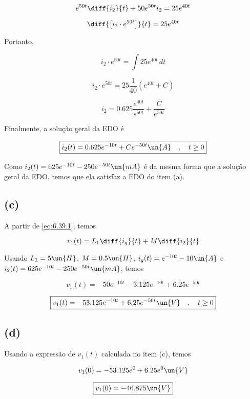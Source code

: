 \[ e^{50t}\diff{i_2}{t} + 50e^{50t}i_2 =  25e^{40t} \]

\[ \diff{\left[i_2 \cdot e^{50t}\right]}{t} = 25e^{40t} \]

Portanto,

\[ i_2 \cdot e^{50t} = \int 25e^{40t} \, dt \]

\[ i_2 \cdot e^{50t} = 25 \frac{1}{40} (e^{40t} + C) \]

\[ i_2 = 0.625 \frac{e^{40t}}{e^{50t}} + \frac{C}{e^{50t}} \]

Finalmente, a solução geral da EDO é

\[ \boxed{i_2(t) = 0.625e^{-10t} + Ce^{-50t} \un{A} \quad , \quad t \geq 0}  \]

Como $i_2(t) = 625e^{-10t} - 250e^{-50t} \un{mA}$ é da mesma forma que a solução geral da EDO, temos que ela satisfaz a
EDO do item (a).

\subsection*{(c)}

A partir de \eqref{eq:6.39.1}, temos

\[ v_1(t) = L_1\diff{i_g}{t} + M\diff{i_2}{t} \]

Usando $L_1 = 5\un{H}$, $M = 0.5 \un{H}$, $i_g(t) = e^{-10t} - 10 \un{A}$ e $i_2(t) = 625e^{-10t} - 250e^{-50t} \un{mA}$, temos

\[ v_1(t) = -50e^{-10t} -3.125e^{-10t} + 6.25e^{-50t} \]

\[ \boxed{v_1(t) = -53.125e^{-10t} + 6.25e^{-50t} \un{V} \quad , \quad t \geq 0}  \]

\subsection*{(d)}

Usando a expressão de $v_1(t)$ calculada no item (c), temos

\[ v_1(0) = -53.125e^{0} + 6.25e^{0} \un{V} \]

\[ \boxed{v_1(0) = -46.875 \un{V}}  \]






